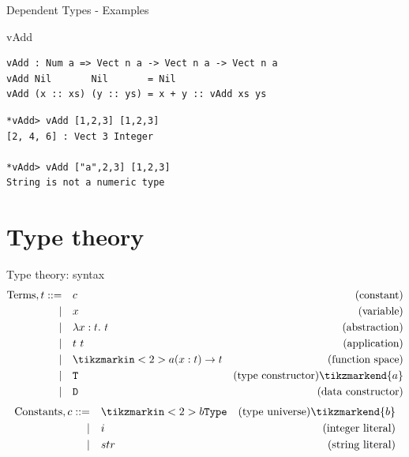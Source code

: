 \documentclass{beamer}
\begin{document}
\begin{frame}[fragile]{Dependent Types - Examples}
	\begin{block}{vAdd}
		\begin{lstlisting}[basicstyle=\ttfamily\scriptsize]
vAdd : Num a => Vect n a -> Vect n a -> Vect n a
vAdd Nil       Nil       = Nil
vAdd (x :: xs) (y :: ys) = x + y :: vAdd xs ys
		\end{lstlisting}
	\end{block}
\begin{block}{}
	\begin{lstlisting}[basicstyle=\ttfamily\scriptsize]
*vAdd> vAdd [1,2,3] [1,2,3]
[2, 4, 6] : Vect 3 Integer

*vAdd> vAdd ["a",2,3] [1,2,3]
String is not a numeric type
	\end{lstlisting}
\end{block}
\end{frame}

\newcommand{\typetheory}{Type theory}
\section{\typetheory}
\label{sec:typetheory}

\begin{frame}{\typetheory: syntax}
    \begin{align*}
        \text{Terms}, t ::= \quad & c & \text{(constant)} \\
          | \quad & x & \text{(variable)} \\
          | \quad & \lambda x : t.\ t & \text{(abstraction)} \\
          | \quad & t\ t & \text{(application)} \\
          | \quad & \tikzmarkin<2>{a} {(}x : t) \to t & \text{(function space)}  \\
          | \quad & \texttt{T} & \text{(type constructor)} \tikzmarkend{a} \\
          | \quad & \texttt{D} & \text{(data constructor)} \\
    \end{align*}
    \begin{align*}
        \text{Constants}, c ::= \quad & \tikzmarkin<2>{b} \texttt{Type} & \text{(type universe)} \tikzmarkend{b} \\
          | \quad & i & \text{(integer literal)} \\
          | \quad & str & \text{(string literal)} \\
    \end{align*}
\end{frame}
\end{document}
